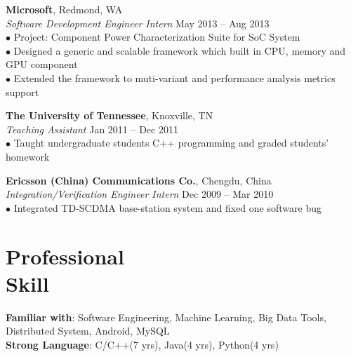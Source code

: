 \documentclass[margin, centered]{resume}
\begin{document}
\begin{resume}
    \textbf{Microsoft}, Redmond, WA \\
    \emph{Software Development Engineer Intern} \hfill May 2013 -- Aug 2013 \\
    $\bullet$ Project: Component Power Characterization Suite for SoC System\\
    $\bullet$ Designed a generic and scalable framework which built in CPU, memory and GPU component\\
    $\bullet$ Extended the framework to muti-variant and performance analysis metrics support 

    \textbf{The University of Tennessee}, Knoxville, TN \\
    \emph{Teaching Assistant} \hfill Jan 2011 -- Dec 2011\\
    $\bullet$ Taught undergraduate students C++ programming and graded students' homework
	
    \textbf{Ericsson (China) Communications Co.}, Chengdu, China \\%
	\emph{Integration/Verification Engineer Intern} \hfill Dec 2009 -- Mar 2010\\
    $\bullet$ Integrated TD-SCDMA base-station system and fixed one software bug

    \section{\mysidestyle Professional \\Skill} 
	
	\textbf{Familiar with}: Software Engineering, Machine Learning, Big Data Tools, Distributed System, Android, MySQL\\
    \textbf{Strong Language}: C/C++(7 yrs), Java(4 yrs), Python(4 yrs)


\end{resume}
\end{document}
